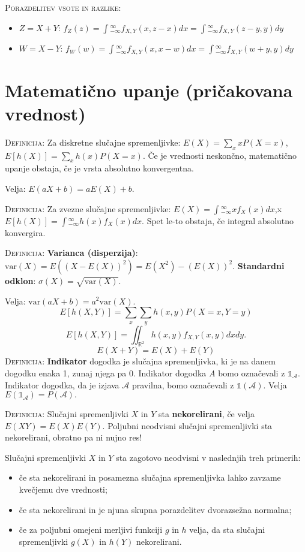 \documentclass[8pt,a4paper]{amsart}
\theoremstyle{definition} %
\theoremstyle{plain} %
\let\oldint\int
\renewcommand{\int}{\oldint \!}
\newcommand{\R}{\mathbb R}
\begin{document}
\textsc{Porazdelitev vsote in razlike:} 
\begin{itemize}
\item $Z=X+Y$: $f_Z(z) = \int_{-\infty}^{\infty}f_{X,Y}(x,z-x)dx = \int_{-\infty}^{\infty}f_{X,Y}(z-y,y)dy$

 \item  $W=X-Y$: $f_W(w) = \int_{-\infty}^{\infty}f_{X,Y}(x,x-w)dx = \int_{-\infty}^{\infty}f_{X,Y}(w+y,y)dy$
\end{itemize}

\section*{Matematično upanje (pričakovana vrednost)}

\textsc{Definicija:} Za diskretne slučajne spremenljivke: $E(X)=\sum_x xP(X=x)$, $E[h(X)]=\sum_x h(x)P(X=x).$ Če je vrednosti neskončno, matematično upanje obstaja, če je vrsta absolutno konvergentna. 

Velja: $E(aX+b)=aE(X)+b$.

\textsc{Definicija:} Za zvezne slučajne spremenljivke: $E(X) = \int_{-\infty}^{\infty}xf_X(x)dx$,x $E[h(X)] = \int_{-\infty}^{\infty}h(x)f_X(x)dx$. Spet le-to obstaja, če integral absolutno konvergira.

\textsc{Definicija:} \textbf{Varianca (disperzija)}: $\text{var}(X) = E((X-E(X))^2) = E(X^2)-(E(X))^2$. \textbf{Standardni odklon}: $\sigma (X) = \sqrt{\text{var}(X)}$.

Velja: $\text{var}(aX+b)=a^2\text{var}(X).$
$$
E[h(X,Y)] = \sum_x \sum_y h(x,y)P(X=x,Y=y)
$$
$$
E[h(X,Y)] = \iint_{\R^2}h(x,y)f_{X,Y}(x,y)dx dy.
$$
$$
E(X+Y)=E(X)+E(Y)
$$
\textsc{Definicija:} \textbf{Indikator} dogodka je slučajna spremenljivka, ki je na danem dogodku enaka 1, zunaj njega pa 0. Indikator dogodka $A$ bomo označevali z $\mathds{1}_\mathcal{A}.$ Indikator dogodka, da je izjava $\mathcal{A}$ pravilna, bomo označevali z $\mathds{1}(\mathcal{A}).$ Velja $E(\mathds{1}_\mathcal{A}) = P(\mathcal{A}).$

\textsc{Definicija: }Slučajni spremenljivki $X$ in $Y$ sta \textbf{nekorelirani}, če velja $E(XY) = E(X)E(Y).$ Poljubni neodvisni slučajni spremenljivki sta nekorelirani, obratno pa ni nujno res!

Slučajni spremenljivki $X$ in $Y$ sta zagotovo neodvisni v naslednjih treh primerih:
\begin{itemize}
\item če sta nekorelirani in posamezna slučajna spremenljivka lahko zavzame kvečjemu dve vrednosti;
\item če sta nekorelirani in je njuna skupna porazdelitev dvorazsežna normalna;
\item če za poljubni omejeni merljivi funkciji $g$ in $h$ velja, da sta slučajni spremenljivki $g(X)$ in $h(Y)$ nekorelirani.
\end{itemize}
\end{document}
